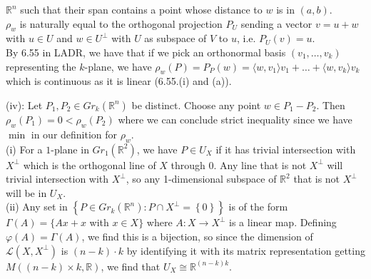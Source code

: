 \documentclass[a4paper]{article}
\begin{document}
     $\mathbb{R}^{n}$ such that their span contains
     a point whose distance to $w$ is in $(a,b)$.\\
     \linebreak
     $\rho_w$ is naturally equal to the
     orthogonal projection $P_U$ sending
     a vector $v = u +w$ with $u \in U$ and $w \in U^{\perp}$ 
     with $U$ as subspace of $V$ to $u$, i.e. $P_U(v) = u$.\\
     By 6.55 in LADR, we have
     that if we pick an orthonormal basis $\left( v_1, \ldots, v_k \right)
     $ representing the $k$-plane, we have
     $\rho_w (P) = P_P (w) = \langle w, v_1 \rangle v_1 +
     \ldots + \langle w, v_k \rangle v_k $ which is continuous
     as it is linear (6.55.(i) and (a)).\\
     \linebreak
     
     






     (iv):
     Let $P_1, P_2 \in Gr_{k}\left( \mathbb{R}^{n} \right) $
     be distinct. Choose any point $w \in P_1 - P_2$. Then
     $\rho_w (P_1) = 0 < \rho_w (P_2)$ where we can conclude strict
     inequality since we have $\min$ in our definition for
     $\rho_w$.\\
     \linebreak
     (i) 
     For a $1$-plane in $Gr_1 \left( \mathbb{R}^2 \right) $,
     we have $P \in U_X$ if it has trivial intersection
     with $X^{\perp}$ which is the orthogonal line of $X$ through
     $0$. Any line that is not $X^{\perp}$ will trivial
     intersection with $X^{\perp}$, so any
     1-dimensional subspace of $\mathbb{R}^2$ that
     is not $X^{\perp}$ will be in $U_X$.\\
     \linebreak
     (ii) 
     Any
     set in
     $\left\{ P \in Gr_{k}\left( \mathbb{R}^{n} \right) 
      \colon P \cap X^{\perp} = \left\{ 0 \right\} \right\} $ 
      is of the form
      $\Gamma (A) = \{ Ax + x$ with $x \in X\}$
      where $A  \colon X \to X^{\perp}$ is
      a linear map. Defining
      $\varphi (A) = \Gamma (A)$, we find
      this is a bijection, so since
      the dimension of  $\mathcal{L}(X, X^{\perp})$ is
      $(n-k) \cdot k$ by identifying it with
      its matrix representation getting
      $M \left( (n-k) \times k, \mathbb{R} \right) $, we find that
      $U_X \cong \mathbb{R}^{(n-k) k}$.
\end{document}
